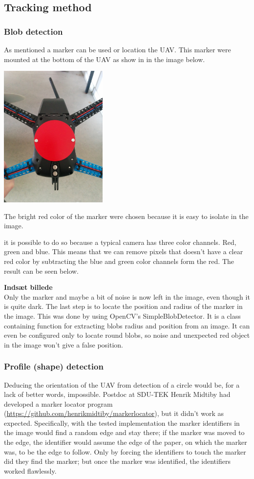 \subsection{Tracking method}
\subsubsection{Blob detection}As mentioned a marker can be used or location the UAV. This marker were mounted at the bottom of the UAV as show in in the image below. 

\begin{center}
	\includegraphics[width=0.4\textwidth, trim=15cm 15cm 12cm 23cm, clip=true]{imgs/blob_example}
\end{center}
The bright red color of the marker were chosen because it is easy to isolate in the image. 

it is possible to do so because a typical camera has three color channels. Red, green and blue. This means that we can remove pixels that doesn't have a clear red color by subtracting the blue and green color channels form the red. 
The result can be seen below.

\Huge
\textbf{Indsæt billede}
\normalsize\\
Only the marker and maybe a bit of noise is now left in the image, even though it is quite dark.
The last step is to locate the position and radius of the marker in the image. This was done by using OpenCV’s SimpleBlobDetector. It is a class containing function for extracting blobs radius and position from an image. It can even be configured only to locate round blobs, so noise and unexpected red object in the image won't give a false position.

\subsubsection{Profile (shape) detection}
Deducing the orientation of the UAV from detection of a circle would be, for a lack of better words, impossible. Postdoc at SDU-TEK Henrik Midtiby had developed a marker locator program (\url{https://github.com/henrikmidtiby/markerlocator}), but it didn’t work as expected. Specifically, with the tested implementation the marker identifiers in the image would find a random edge and stay there; if the marker was moved to the edge, the identifier would assume the edge of the paper, on which the marker was, to be the edge to follow. Only by forcing the identifiers to touch the marker did they find the marker; but once the marker was identified, the identifiers worked flawlessly. 

